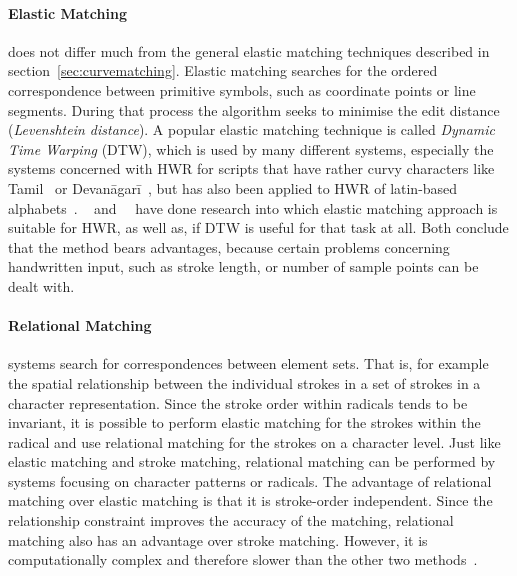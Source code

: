 \paragraph{Elastic Matching} does not differ much from the general elastic matching 
techniques described in section~\ref{sec:curvematching}. Elastic matching 
searches for the ordered correspondence between primitive symbols, such as 
coordinate points or line segments. During that process the algorithm seeks to
minimise the edit distance (\emph{Levenshtein distance}). A popular elastic 
matching technique is called \emph{Dynamic Time Warping} (DTW), which is used by
many different systems, especially the systems concerned with HWR for scripts that
have rather curvy characters like Tamil~ or 
Devanāgarī~, but has also been applied to HWR of
latin-based alphabets~.
~\citeyear{Niels2004} and~~\citeyear{Joshi2004a} have done research into which 
elastic matching approach is suitable for HWR, as well as, if DTW is useful for 
that task at all. Both conclude that the method bears advantages, because 
certain problems concerning handwritten input, such as stroke length, or number 
of sample points can be dealt with.

\paragraph{Relational Matching} systems search for correspondences between 
element sets. That is, for example the spatial relationship between the 
individual strokes in a set of strokes in a character representation. 
Since the stroke order within radicals tends to be invariant, 
it is possible to perform elastic matching for the strokes
within the radical and use relational matching for the strokes on a character 
level. Just like elastic matching and stroke matching, relational matching can
be performed by systems focusing on character patterns or radicals.
The advantage of relational matching over elastic matching is that it is 
stroke-order independent. Since the relationship constraint improves the accuracy
of the matching, relational matching also has an advantage over stroke matching.
However, it is computationally complex and therefore slower than the other 
two methods~.

